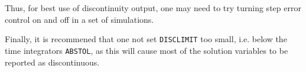 Thus, for best use of discontinuity output, one may need to try turning step error control on and
off in a set of simulations.  

Finally, it is recommened that one not set \texttt{DISCLIMIT} 
too small, i.e. below the time integrators \texttt{ABSTOL}, as this will cause most of the 
solution variables to be reported as discontinuous. 

\label{SimulationIssues}

